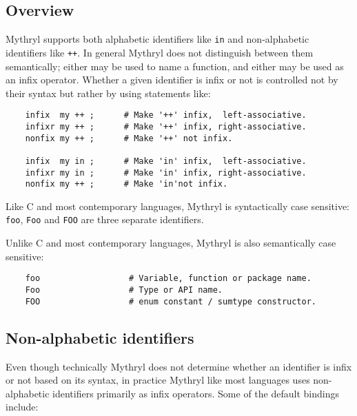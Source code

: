 
\subsection{Overview}
\label{section:ref:identifiers:overview}

Mythryl supports both alphabetic identifiers like {\tt in} and 
non-alphabetic identifiers like {\tt ++}.  In general Mythryl does 
not distinguish between them semantically;  either may be used to 
name a function, and either may be used as an infix operator. 
Whether a given identifier is infix or not is controlled not 
by their syntax but rather by using statements like:

\begin{verbatim}
    infix  my ++ ;      # Make '++' infix,  left-associative.
    infixr my ++ ;      # Make '++' infix, right-associative.
    nonfix my ++ ;      # Make '++' not infix.

    infix  my in ;      # Make 'in' infix,  left-associative.
    infixr my in ;      # Make 'in' infix, right-associative.
    nonfix my ++ ;      # Make 'in'not infix.
\end{verbatim}

Like C and most contemporary languages, Mythryl is syntactically 
case sensitive: {\tt foo}, {\tt Foo} and {\tt FOO} are three 
separate identifiers.

Unlike C and most contemporary languages, Mythryl is also 
semantically case sensitive:

\begin{verbatim}
    foo                  # Variable, function or package name.
    Foo                  # Type or API name.
    FOO                  # enum constant / sumtype constructor.
\end{verbatim}

\cutend*

\subsection{Non-alphabetic identifiers}
\label{section:ref:identifiers:non-alphabetic}

Even though technically Mythryl does not determine 
whether an identifier is infix or not based on its 
syntax, in practice Mythryl like most languages 
uses non-alphabetic identifiers primarily as infix 
operators.  Some of the default bindings include:

